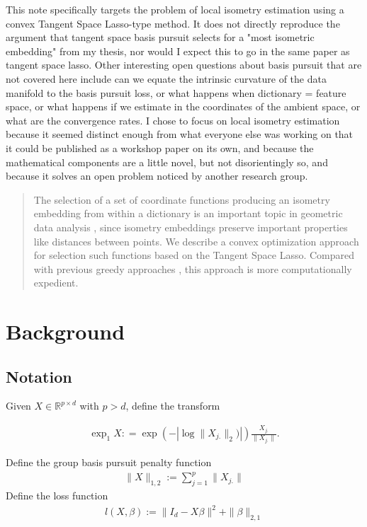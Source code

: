 \documentclass[a4paper,11pt]{article}
\begin{document}
This note specifically targets the problem of local isometry estimation using a convex Tangent Space Lasso-type method.  It does not directly reproduce the argument that tangent space basis pursuit selects for a "most isometric embedding" from my thesis, nor would I expect this to go in the same paper as tangent space lasso. Other interesting open questions about basis pursuit that are not covered here include can we equate the intrinsic curvature of the data manifold to the basis pursuit loss, or what happens when dictionary = feature space, or what happens if we estimate in the coordinates of the ambient space, or what are the convergence rates.  I chose to focus on local isometry estimation because it seemed distinct enough from what everyone else was working on that it could be published as a workshop paper on its own, and because the mathematical components are a little novel, but not disorientingly so, and because it solves an open problem noticed by another research group.

\begin{abstract}

The selection of a set of coordinate functions producing an isometry embedding from within a dictionary is an important topic in geometric data analysis \cite{Gal Mishne paper}, since isometry embeddings preserve important properties like distances between points.
We describe a convex optimization approach for selection such functions based on the Tangent Space Lasso.
Compared with previous greedy approaches \cite{https://openreview.net/pdf?id=GugzbdAoHG, chen and meila, ldle}, this approach is more computationally expedient.

\end{abstract}

\section{Background}

\subsection{Notation}

Given $X \in \mathbb R^{p \times d}$ with $p > d$, define the transform

\begin{align}
\exp_1 X : = \exp (- | \log \|X_{j.}\|_2)|) \frac{X_{j.}}{\|X_{j.}\|}.
\end{align}

Define the group basis pursuit penalty function 
\begin{align}
\|X\|_{1,2} := \sum_{j=1}^p  \|X_{j.}\|
\end{align}
Define the loss function
\begin{align}
l (X, \beta) := \|I_d - X\beta\|^2 + \|\beta\|_{2,1}
\end{align}
\end{document}
